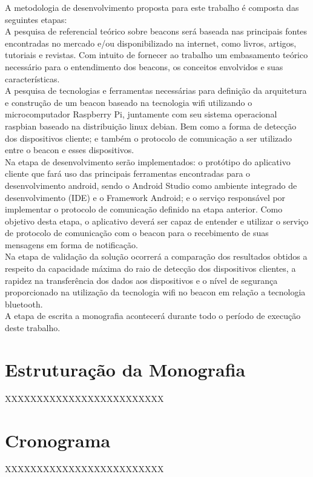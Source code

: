 A metodologia de desenvolvimento proposta para este trabalho é composta das seguintes etapas: \\
\indent A pesquisa de referencial teórico sobre beacons será baseada nas principais fontes encontradas no mercado e/ou disponibilizado na internet, como livros, artigos, tutoriais e revistas. Com intuito de fornecer ao trabalho um embasamento teórico necessário para o entendimento dos beacons, os conceitos envolvidos e suas características. \\
\indent A pesquisa de tecnologias e ferramentas necessárias para definição da arquitetura e construção de um beacon baseado na tecnologia wifi utilizando o microcomputador Raspberry Pi, juntamente com seu sistema operacional raspbian baseado na distribuição linux debian. Bem como a forma de detecção dos dispositivos cliente; e também o protocolo de comunicação a ser utilizado entre o beacon e esses dispositivos. \\
\indent Na etapa de desenvolvimento serão implementados: o protótipo do aplicativo cliente que fará uso das principais ferramentas encontradas para o desenvolvimento android, sendo o Android Studio como ambiente integrado de desenvolvimento (IDE) e o Framework Android; e o serviço responsável por implementar o protocolo de comunicação definido na etapa anterior. Como objetivo desta etapa, o aplicativo deverá ser capaz de entender e utilizar o serviço de protocolo de comunicação com o beacon para o recebimento de suas mensagens em forma de notificação. \\
\indent Na etapa de validação da solução ocorrerá a comparação dos resultados obtidos a respeito da capacidade máxima do raio de detecção dos dispositivos clientes, a rapidez na transferência dos dados aos dispositivos e o nível de segurança proporcionado na utilização da tecnologia wifi no beacon em relação a tecnologia bluetooth. \\
\indent A etapa de escrita a monografia acontecerá durante todo o período de execução deste trabalho.

\section{Estruturação da Monografia}
\label{sec:estruturacao-monografia}

XXXXXXXXXXXXXXXXXXXXXXXXX

\section{Cronograma}
\label{sec:cronograma}

XXXXXXXXXXXXXXXXXXXXXXXXX